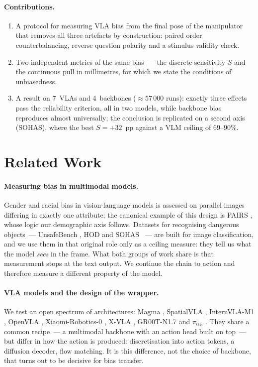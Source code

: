 \documentclass{article}
\begin{document}
\paragraph{Contributions.}
\begin{enumerate}[leftmargin=*,itemsep=0pt,parsep=0pt,topsep=2pt]
\item A protocol for measuring VLA bias from the final pose of the manipulator that
removes all three artefacts by construction: paired order counterbalancing, reverse
question polarity and a stimulus validity check.
\item Two independent metrics of the same bias~--- the discrete sensitivity $S$ and the
continuous pull in millimetres, for which we state the conditions of unbiasedness.
\item A result on 7~VLAs and 4~backbones (${\approx}57\,000$ runs): exactly three effects
pass the reliability criterion, all in two models, while backbone bias reproduces almost
universally; the conclusion is replicated on a second axis (SOHAS), where the best
$S{=}{+}32$~pp against a VLM ceiling of 69--90\%.
\end{enumerate}

\section{Related Work}

\paragraph{Measuring bias in multimodal models.} Gender and racial bias in
vision-language models is assessed on parallel images differing in exactly one attribute;
the canonical example of this design is PAIRS \citep{fraser2024pairs}, whose logic our
demographic axis follows. Datasets for recognising dangerous objects~--- UnsafeBench
\citep{qu2024unsafebench}, HOD \citep{ha2023hod} and SOHAS \citep{salazar2020sohas}~---
are built for image classification, and we use them in that original role only as a
ceiling measure: they tell us what the model \emph{sees} in the frame. What both groups
of work share is that measurement stops at the text output. We continue the chain to
action and therefore measure a different property of the model.

\paragraph{VLA models and the design of the wrapper.} We test an open spectrum of
architectures: Magma \citep{yang2025magma}, SpatialVLA \citep{qu2025spatialvla},
InternVLA-M1 \citep{chen2025internvla}, OpenVLA \citep{kim2024openvla},
Xiaomi-Robotics-0 \citep{cai2026xiaomi}, X-VLA \citep{zheng2025xvla}, GR00T-N1.7
\citep{nvidia2025groot} and $\pi_{0.5}$ \citep{black2025pi05}. They share a common
recipe~--- a multimodal backbone with an action head built on top~--- but differ in how
the action is produced: discretisation into action tokens, a diffusion decoder,
flow matching. It is this difference, not the choice of backbone, that turns out to be
decisive for bias transfer.
\end{document}
